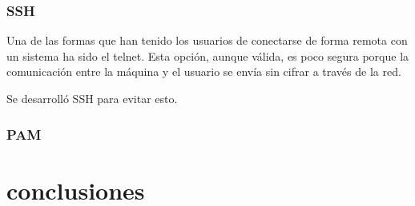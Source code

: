 \documentclass[titlepage, 12pt, a4paper]{article}
\begin{document}
\subsubsection{\Gls{SSH}}
Una de las formas que han tenido los usuarios de conectarse de forma remota con un sistema ha sido el \Gls{telnet}. Esta opción, aunque válida, es poco segura porque la comunicación entre la máquina y el usuario se envía sin cifrar a través de la red.\par Se desarrolló SSH para evitar esto.

\subsubsection{\Gls{PAM}}
\section{conclusiones}
\clearpage
\printbibliography[heading=bibintoc,title={Bibliografía}]
\end{document}
